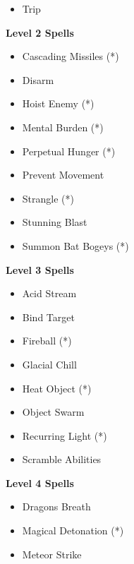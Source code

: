 \begin{multicols}{4}
{\begin{itemize}[itemsep=0em]
\item Trip


\end{itemize}
\textbf{Level 2 Spells}
\begin{itemize}[itemsep=0em]
\renewcommand\labelitemi{-}
\item Cascading Missiles (*) 

\item Disarm

\item Hoist Enemy (*) 

\item Mental Burden (*) 

\item Perpetual Hunger (*) 

\item Prevent Movement

\item Strangle (*) 

\item Stunning Blast

\item Summon Bat Bogeys (*) 


\end{itemize}
\textbf{Level 3 Spells}
\begin{itemize}[itemsep=0em]
\renewcommand\labelitemi{-}
\item Acid Stream

\item Bind Target

\item Fireball (*) 

\item Glacial Chill

\item Heat Object (*) 

\item Object Swarm

\item Recurring Light (*) 

\item Scramble Abilities


\end{itemize}
\textbf{Level 4 Spells}
\begin{itemize}[itemsep=0em]
\renewcommand\labelitemi{-}
\item Dragon{\apos}s Breath

\item Magical Detonation (*) 

\item Meteor Strike


\end{itemize}}
\end{multicols}

